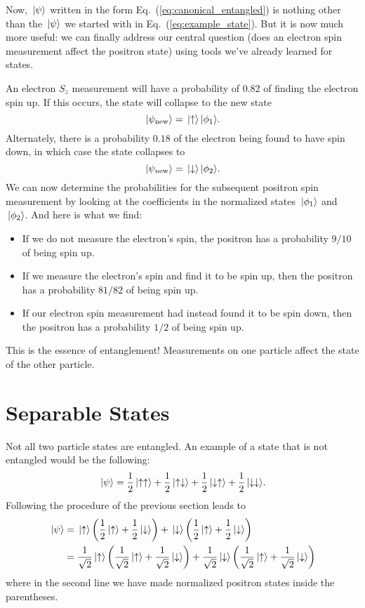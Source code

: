 Now, $\,|\mbox{$\psi$}\rangle$ written in the form
Eq.~(\ref{eq:canonical_entangled}) is nothing other than the
$\,|\mbox{$\psi$}\rangle$ we started with in Eq.~(\ref{eq:example_state}).  But it
is now much more useful: we can finally address our central question
(does an electron spin measurement affect the positron state)
using tools we've already learned for states.

An electron $S_z$ measurement will have a probability of $0.82$ of finding
the electron spin up.  If this occurs, the state will collapse to the
new state
\begin{equation}
\,|\mbox{$\psi_\text{new}$}\rangle = \,|\mbox{$\uparrow$}\rangle\,|\mbox{$\phi_1$}\rangle.
\end{equation}
Alternately, there is a probability $0.18$ of the electron being
found to have spin down, in which case the state collapses to
\begin{equation}
\,|\mbox{$\psi_\text{new}$}\rangle = \,|\mbox{$\downarrow$}\rangle\,|\mbox{$\phi_2$}\rangle.
\end{equation}
We can now determine the probabilities for the subsequent positron
spin measurement by looking at the coefficients in the normalized
states $\,|\mbox{$\phi_1$}\rangle$ and $\,|\mbox{$\phi_2$}\rangle$.  And here is what we find:
\begin{itemize}
\item If we do not measure the electron's spin, the positron has a 
probability $9/10$ of being spin up.
\item If we measure the electron's spin and find it to be spin up, then the
positron has a probability $81/82$ of being spin up.
\item If our electron spin measurement had instead found it to be spin
down, then the positron has a probability $1/2$ of being spin up.
\end{itemize}
This is the essence of entanglement!  Measurements on one particle affect
the state of the other particle.


\section{Separable States}
\label{sec:separable_states}

Not all two particle states are entangled.  An example of a state that
is not entangled would be the following:
\begin{equation}
\,|\mbox{$\psi$}\rangle = \frac{1}{2}\,|\mbox{$\uparrow\uparrow$}\rangle +
\frac{1}{2}\,|\mbox{$\uparrow\downarrow$}\rangle +
\frac{1}{2}\,|\mbox{$\downarrow\uparrow$}\rangle +
\frac{1}{2}\,|\mbox{$\downarrow\downarrow$}\rangle  .
\label{eq:separable_state}
\end{equation}
Following the procedure of the previous section leads to
\begin{align}
\,|\mbox{$\psi$}\rangle &= \,|\mbox{$\uparrow$}\rangle
\left(\frac{1}{2}\,|\mbox{$\uparrow$}\rangle +\frac{1}{2}\,|\mbox{$\downarrow$}\rangle\right)
+ \,|\mbox{$\downarrow$}\rangle
\left(\frac{1}{2}\,|\mbox{$\uparrow$}\rangle +\frac{1}{2}\,|\mbox{$\downarrow$}\rangle\right) 
\nonumber\\
&=\frac{1}{\sqrt{2}}\,|\mbox{$\uparrow$}\rangle
\left(\frac{1}{\sqrt{2}}\,|\mbox{$\uparrow$}\rangle +\frac{1}{\sqrt{2}}\,|\mbox{$\downarrow$}\rangle
 \right)
+\frac{1}{\sqrt{2}}\,|\mbox{$\downarrow$}\rangle
\left(\frac{1}{\sqrt{2}}\,|\mbox{$\uparrow$}\rangle +\frac{1}{\sqrt{2}}\,|\mbox{$\downarrow$}\rangle
 \right)
\end{align}
where in the second line we have made normalized positron states inside
the parentheses.  

